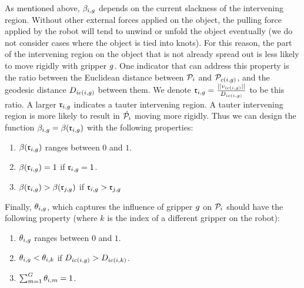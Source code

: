 As mentioned above, $\beta_{i, g}$ depends on the current slackness of the intervening region. Without other external forces applied on the object, the pulling force applied by the robot will tend to unwind or unfold the object eventually (we do not consider cases where the object is tied into knots). For this reason,  the part of the intervening region on the object that is not already spread out is less likely to move rigidly with gripper $g$. One indicator that can address this property is the ratio between the Euclidean distance between $\mathcal{P}_i$ and $\mathcal{P}_{c(i, g)}$, and the geodesic distance $D_{i c(i, g)}$ between them. We denote $\mathfrak{r}_{i, g} = \frac{||v_{i c(i, g)}||}{D_{i c(i, g)}}$ to be this ratio. A larger $\mathfrak{r}_{i, g}$ indicates a tauter intervening region. A tauter intervening region is more likely to result in $\dot{\mathcal{P}_i}$ moving more rigidly. Thus we can design the function $\beta_{i, g} = \beta(\mathfrak{r}_{i, g})$ with the following properties:
\begin{enumerate}
    \item $\beta(\mathfrak{r}_{i, g})$ ranges between $0$ and $1$.
    \item $\beta(\mathfrak{r}_{i, g}) = 1$ if $\mathfrak{r}_{i, g} = 1$.
    \item $\beta(\mathfrak{r}_{i, g}) > \beta(\mathfrak{r}_{j, g})$ if $\mathfrak{r}_{i, g} > \mathfrak{r}_{j, g}$
\end{enumerate}

Finally, $\theta_{i, g}$, which captures the influence of gripper $g$ on $\mathcal{P}_i$ should have the following property (where $k$ is the index of a different gripper on the robot):
\begin{enumerate}
    \item $\theta_{i, g}$ ranges between $0$ and $1$.
    \item $\theta_{i, g} < \theta_{i, k}$ if $D_{i c(i, g)} > D_{i c(i, k)}$.
    \item $\sum_{m = 1}^{G} \theta_{i, m} = 1$.
\end{enumerate}

